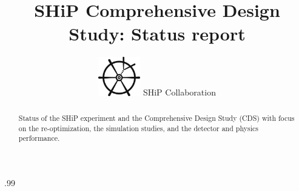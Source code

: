 \documentclass{cernrep}
\begin{document}
\title{SHiP Comprehensive Design Study: Status report}

\author{\includegraphics[height=17mm]{figs/SHiP-Symbol_Black} SHiP Collaboration}


\begin{abstract}
Status of the SHiP experiment and the Comprehensive Design Study (CDS) with focus on the re-optimization, the simulation studies, and the detector and physics performance. 
\end{abstract}


\maketitle

\begingroup\baselineskip.99\baselineskip
\tableofcontents
\endgroup

%



%

%

%

%

%

%


\end{document}
